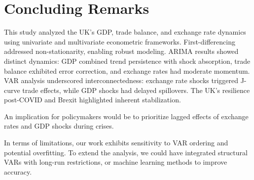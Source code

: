 \documentclass[
]{article}
\begin{document}













\section{Concluding Remarks}
This study analyzed the UK’s GDP, trade balance, and exchange rate dynamics using univariate and multivariate econometric frameworks. 
First-differencing addressed non-stationarity, enabling robust modeling. ARIMA results showed distinct dynamics:
GDP combined trend persistence with shock absorption, trade balance exhibited error correction, and exchange rates had moderate momentum.
VAR analysis underscored interconnectedness: exchange rate shocks triggered
J-curve trade effects, while GDP shocks had delayed spillovers. 
The UK’s resilience post-COVID and Brexit highlighted inherent stabilization.

An implication for policymakers would be to prioritize lagged effects of exchange rates and GDP shocks during crises.

In terms of limitations, our work exhibits sensitivity to VAR ordering and potential overfitting. 
To extend the analysis, we could have integrated structural VARs with long-run restrictions, or machine 
learning methods to improve accuracy.
\end{document}

